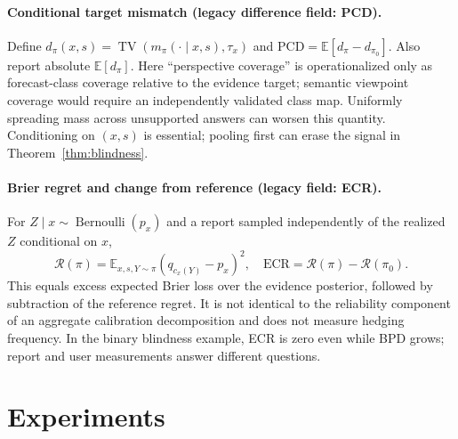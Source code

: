 \documentclass[10pt]{article}
\newcommand{\E}{\mathbb E}
\newcommand{\TV}{\operatorname{TV}}
\begin{document}
\paragraph{Conditional target mismatch (legacy difference field: PCD).}
Define $d_\pi(x,s)=\TV(m_\pi(\cdot\mid x,s),\tau_x)$ and
$\mathrm{PCD}=\E[d_\pi-d_{\pi_0}]$. Also report absolute $\E[d_\pi]$.
Here ``perspective coverage'' is operationalized only as forecast-class
coverage relative to the evidence target; semantic viewpoint coverage
would require an independently validated class map. Uniformly spreading
mass across unsupported answers can worsen this quantity. Conditioning on
$(x,s)$ is essential; pooling first can erase the signal in
Theorem~\ref{thm:blindness}.

\paragraph{Brier regret and change from reference (legacy field: ECR).}
For $Z\mid x\sim\operatorname{Bernoulli}(p_x)$ and a report sampled independently
of the realized $Z$ conditional on $x$,
\begin{equation}
 \mathcal R(\pi)=\E_{x,s,Y\sim\pi}(q_{c_x(Y)}-p_x)^2,
 \quad \mathrm{ECR}=\mathcal R(\pi)-\mathcal R(\pi_0).
 \label{eq:ecr}
\end{equation}
This equals excess expected Brier loss over the evidence posterior, followed
by subtraction of the reference regret. It is not identical to the reliability
component of an aggregate calibration decomposition and does not measure hedging frequency. In the binary blindness example, ECR is zero even while BPD grows;
report and user measurements answer different questions.

\section{Experiments}
\end{document}
